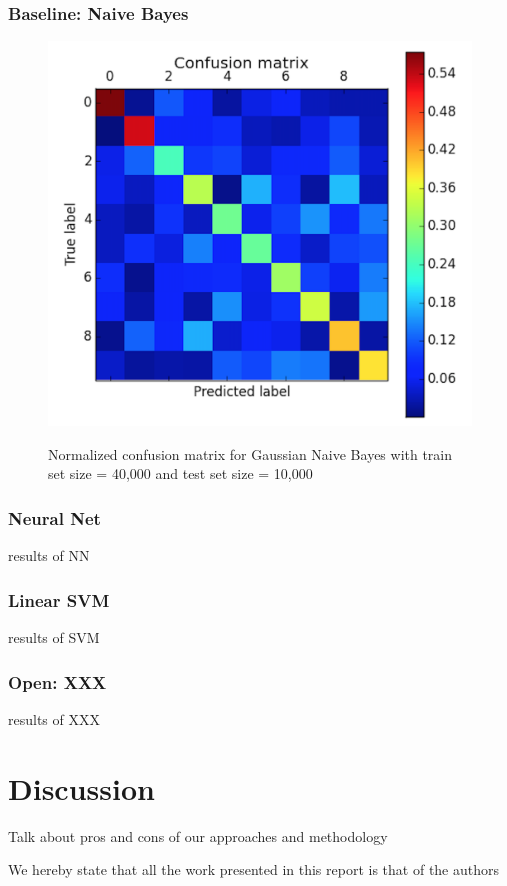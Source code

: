 \documentclass{acm_proc_article-sp}
\begin{document}
\subsubsection{Baseline: Naive Bayes}
\begin{figure} 
\center
\includegraphics[width=0.9\columnwidth]{graphs/gnb_cm1.png}  \label{fig:gnb_cm}
\caption{Normalized confusion matrix for Gaussian Naive Bayes with train set size = 40,000 and test set size = 10,000}
\end{figure}


\subsubsection{Neural Net}
results of NN

\subsubsection{Linear SVM }
results of SVM

\subsubsection{Open: XXX}
results of XXX 



\section{Discussion}
Talk about pros and cons	of	our	approaches and	methodology


We	hereby	state	that	all	the	work	 presented	in	this	report	is	that	of	the	authors

  
\end{document}
